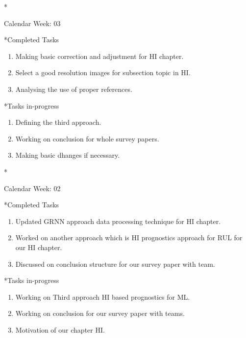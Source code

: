 \documentclass[11pt,a4paper]{article}
\begin{document}
\newpage
\begin{section}*{Calendar Week: 03 \hfill \date{22 January, 2021}}

    \begin{subsection}*{Completed Tasks}
        \begin{enumerate}
            \item
                Making basic correction and adjustment for HI chapter.
            \item
                Select a good resolution images for subsection topic in HI.
            \item
                Analysing the use of proper references.
        \end{enumerate}
    \end{subsection}
    
    \begin{subsection}*{Tasks in-progress}
        \begin{enumerate}
            \item
                Defining the third approach.
            \item
                Working on conclusion for whole survey papers.
            \item
                Making basic dhanges if necessary.
        \end{enumerate}
    \end{subsection}
\end{section}

\newpage
\begin{section}*{Calendar Week: 02 \hfill \date{15 January, 2021}}

\begin{subsection}*{Completed Tasks}
    \begin{enumerate}
        \item
            Updated GRNN approach data processing technique for HI chapter.
        \item
            Worked on another approach which is HI prognostics approach for RUL for our HI chapter.
        \item
            Discussed on conclusion structure for our survey paper with team.
    \end{enumerate}
\end{subsection}

\begin{subsection}*{Tasks in-progress}
    \begin{enumerate}
        \item
            Working on Third approach HI based prognostics for ML.
        \item
            Working on conclusion for our survey paper with teams.
        \item
            Motivation of our chapter HI.
    \end{enumerate}
\end{subsection}
\end{section}
\end{document}
